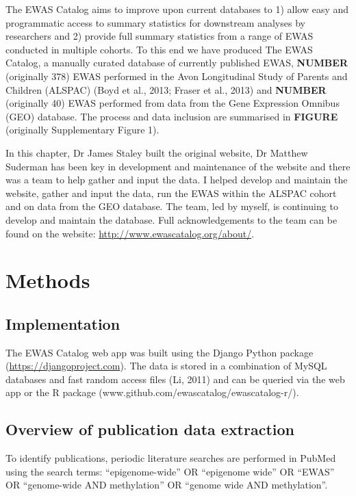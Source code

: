 \documentclass[11pt,twoside]{bristolthesis}
\begin{document}
The EWAS Catalog aims to improve upon current databases to 1) allow easy and programmatic access to summary statistics for downstream analyses by researchers and 2) provide full summary statistics from a range of EWAS conducted in multiple cohorts. To this end we have produced The EWAS Catalog, a manually curated database of currently published EWAS, \textbf{NUMBER} (originally 378) EWAS performed in the Avon Longitudinal Study of Parents and Children (ALSPAC) (Boyd et al., 2013; Fraser et al., 2013) and \textbf{NUMBER} (originally 40) EWAS performed from data from the Gene Expression Omnibus (GEO) database. The process and data inclusion are summarised in \textbf{FIGURE} (originally Supplementary Figure 1).

In this chapter, Dr James Staley built the original website, Dr Matthew Suderman has been key in development and maintenance of the website and there was a team to help gather and input the data. I helped develop and maintain the website, gather and input the data, run the EWAS within the ALSPAC cohort and on data from the GEO database. The team, led by myself, is continuing to develop and maintain the database. Full acknowledgements to the team can be found on the website: \url{http://www.ewascatalog.org/about/}.

\hypertarget{methods-1}{%
\section{Methods}\label{methods-1}}

\hypertarget{implementation}{%
\subsection{Implementation}\label{implementation}}

The EWAS Catalog web app was built using the Django Python package (\url{https://djangoproject.com}). The data is stored in a combination of MySQL databases and fast random access files (Li, 2011) and can be queried via the web app or the R package (www.github.com/ewascatalog/ewascatalog-r/).

\hypertarget{overview-of-publication-data-extraction}{%
\subsection{Overview of publication data extraction}\label{overview-of-publication-data-extraction}}

To identify publications, periodic literature searches are performed in PubMed using the search terms: ``epigenome-wide'' OR ``epigenome wide'' OR ``EWAS'' OR ``genome-wide AND methylation'' OR ``genome wide AND methylation''.
\end{document}
